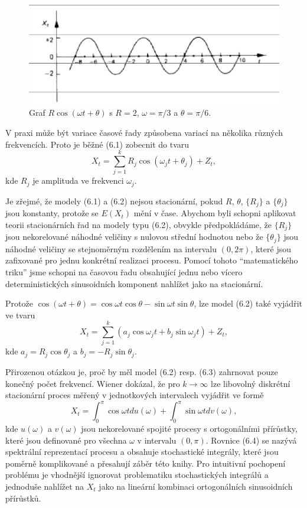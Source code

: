 \begin{figure}[htp]
\centering
\includegraphics[scale = 0.75]{pictures/figure_6_1.eps}
\caption{Graf $R \cos(\omega t + \theta)$ s $R=2$, $\omega = \pi / 3$ a $\theta = \pi / 6$.}
\label{figure_6_1}
\end{figure}

V praxi může být variace časové řady způsobena variací na několika různých frekvencích. Proto je běžné (6.1) zobecnit do tvaru
\begin{equation}
X_t = \sum_{j=1}^k R_j \cos(\omega_j t + \theta_j) + Z_t,
\end{equation}
kde $R_j$ je amplituda ve frekvenci $\omega_j$.

Je zřejmé, že modely (6.1) a (6.2) nejsou stacionární, pokud $R$, $\theta$, $\{R_j\}$ a $\{\theta_j\}$ jsou konstanty, protože se $E(X_t)$ mění v čase. Abychom byli schopni aplikovat teorii stacionárních řad na modely typu (6.2), obvykle předpokládáme, že $\{R_j\}$ jsou nekorelované náhodné veličiny s nulovou střední hodnotou nebo že $\{\theta_j\}$ jsou náhodné veličiny se stejnoměrným rozdělením na intervalu $(0, 2 \pi)$, které jsou zafixované pro jednu konkrétní realizaci procesu. Pomocí tohoto ``matematického triku'' jsme schopni na časovou řadu obsahující jednu nebo vícero deterministických sinusoidních komponent nahlížet jako na stacionární.

Protože $\cos(\omega t + \theta) = \cos \omega t \cos \theta - \sin \omega t \sin \theta$, lze model (6.2) také vyjádřit ve tvaru
\begin{equation}
X_t = \sum_{j=1}^k (a_j \cos \omega_j t + b_j \sin \omega_j t) + Z_t,
\end{equation}
kde $a_j = R_j \cos \theta_j$ a $b_j = - R_j \sin \theta_j$.

Přirozenou otázkou je, proč by měl model (6.2) resp. (6.3) zahrnovat pouze konečný počet frekvencí. Wiener dokázal, že pro $k \rightarrow \infty$ lze libovolný diskrétní stacionární proces měřený v jednotkových intervalech vyjádřit ve formě
\begin{equation}
X_t = \int_0^{\pi} \cos \omega t du(\omega) + \int_0^{\pi} \sin \omega t dv(\omega),
\end{equation}
kde $u(\omega)$ a $v(\omega)$ jsou nekorelované spojité procesy s ortogonálními přírůstky, které jsou definované pro všechna $\omega$ v intervalu $(0, \pi)$. Rovnice (6.4) se nazývá spektrální reprezentací procesu a obsahuje stochastické integrály, které jsou poměrně komplikované a přesahují záběr této knihy. Pro intuitivní pochopení problému je vhodnější ignorovat problematiku stochastických integrálů a jednoduše nahlížet na $X_t$ jako na lineární kombinaci ortogonálních sinusoidních přírůstků.


